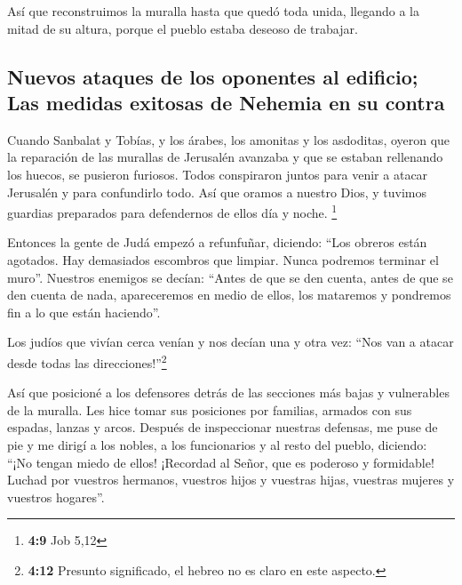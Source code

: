  Así que reconstruimos la muralla hasta que quedó toda
unida, llegando a la mitad de su altura, porque el pueblo estaba deseoso
de trabajar.

\hypertarget{nuevos-ataques-de-los-oponentes-al-edificio-las-medidas-exitosas-de-nehemia-en-su-contra}{%
\subsection{Nuevos ataques de los oponentes al edificio; Las medidas
exitosas de Nehemia en su
contra}\label{nuevos-ataques-de-los-oponentes-al-edificio-las-medidas-exitosas-de-nehemia-en-su-contra}}

 Cuando Sanbalat y Tobías, y los árabes, los amonitas y
los asdoditas, oyeron que la reparación de las murallas de Jerusalén
avanzaba y que se estaban rellenando los huecos, se pusieron furiosos.
 Todos conspiraron juntos para venir a atacar Jerusalén y
para confundirlo todo.  Así que oramos a nuestro Dios, y
tuvimos guardias preparados para defendernos de ellos día y noche.
\footnote{\textbf{4:9} Job 5,12}

 Entonces la gente de Judá empezó a refunfuñar, diciendo:
``Los obreros están agotados. Hay demasiados escombros que limpiar.
Nunca podremos terminar el muro''.  Nuestros enemigos se
decían: ``Antes de que se den cuenta, antes de que se den cuenta de
nada, apareceremos en medio de ellos, los mataremos y pondremos fin a lo
que están haciendo''.

 Los judíos que vivían cerca venían y nos decían una y
otra vez: ``Nos van a atacar desde todas las direcciones!''\footnote{\textbf{4:12}
  Presunto significado, el hebreo no es claro en este aspecto.}

 Así que posicioné a los defensores detrás de las
secciones más bajas y vulnerables de la muralla. Les hice tomar sus
posiciones por familias, armados con sus espadas, lanzas y arcos.
 Después de inspeccionar nuestras defensas, me puse de
pie y me dirigí a los nobles, a los funcionarios y al resto del pueblo,
diciendo: ``¡No tengan miedo de ellos! ¡Recordad al Señor, que es
poderoso y formidable! Luchad por vuestros hermanos, vuestros hijos y
vuestras hijas, vuestras mujeres y vuestros hogares''.

